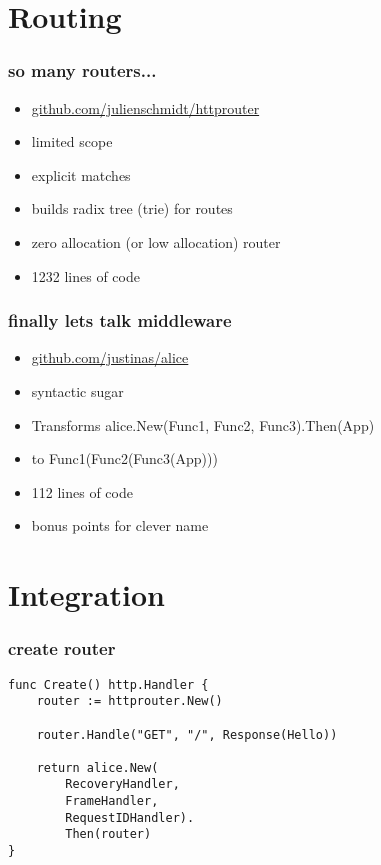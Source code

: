\documentclass{beamer}
\begin{document}
\section{Routing}

\begin{frame}[fragile]
\frametitle{so many routers...}
\begin{itemize}
\item \href{https://github.com/julienschmidt/httprouter}{github.com/julienschmidt/httprouter}
\item limited scope
\item explicit matches
\item builds radix tree (trie) for routes
\item zero allocation (or low allocation) router
\item 1232 lines of code
\end{itemize}
\end{frame}

\begin{frame}[fragile]
\frametitle{finally lets talk middleware}
\begin{itemize}
\item \href{https://github.com/justinas/alice}{github.com/justinas/alice}
\item syntactic sugar
\item Transforms alice.New(Func1, Func2, Func3).Then(App)
\item to Func1(Func2(Func3(App)))
\item 112 lines of code
\item bonus points for clever name
\end{itemize}
\end{frame}	

\section{Integration}

\begin{frame}[fragile]
\frametitle{create router}
\begin{lstlisting}[basicstyle=\ttfamily\footnotesize]
func Create() http.Handler {
	router := httprouter.New()

	router.Handle("GET", "/", Response(Hello))

	return alice.New(
		RecoveryHandler,
		FrameHandler,
		RequestIDHandler).
		Then(router)
}
\end{lstlisting}
\end{frame}
\end{document}

